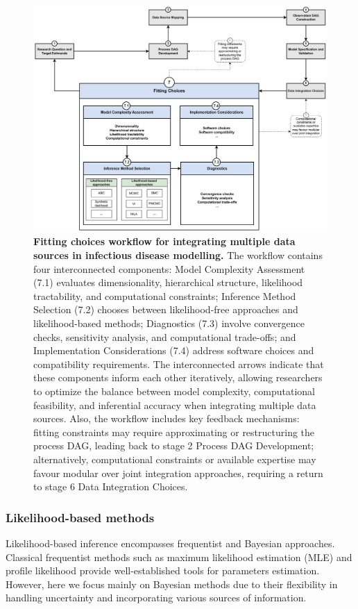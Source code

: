 \documentclass{article}
\begin{document}
\begin{figure}[htbp]
    \centering
    \includegraphics[width=\textwidth]{figures/subpanel_fitting choices.drawio.pdf}
    \caption{\textbf{Fitting choices workflow for integrating multiple data sources in infectious disease modelling.} The workflow contains four interconnected components: Model Complexity Assessment (7.1) evaluates dimensionality, hierarchical structure, likelihood tractability, and computational constraints; Inference Method Selection (7.2) chooses between likelihood-free approaches and likelihood-based methods; Diagnostics (7.3) involve convergence checks, sensitivity analysis, and computational trade-offs; and Implementation Considerations (7.4) address software choices and compatibility requirements. The interconnected arrows indicate that these components inform each other iteratively, allowing researchers to optimize the balance between model complexity, computational feasibility, and inferential accuracy when integrating multiple data sources. Also, the workflow includes key feedback mechanisms: fitting constraints may require approximating or restructuring the process DAG, leading back to stage 2 Process DAG Development; alternatively, computational constraints or available expertise may favour modular over joint integration approaches, requiring a return to stage 6 Data Integration Choices. }
    \label{fig:fitting}
\end{figure}


\subsubsection{Likelihood-based methods}
Likelihood-based inference encompasses frequentist and Bayesian approaches. Classical frequentist methods such as maximum likelihood estimation (MLE)\citep{myung2003tutorial, baltazar2024maximum} and profile likelihood \citep{tonsing2018profile, plank2024structured} provide well-established tools for parameters estimation. However, here we focus mainly on Bayesian methods due to their flexibility in handling uncertainty and incorporating various sources of information.
\end{document}
